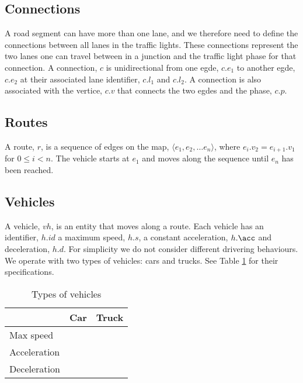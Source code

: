 \subsection{Connections}
A road segment can have more than one lane, and we therefore need to define the connections between all lanes in the traffic lights.
These connections represent the two lanes one can travel between in a junction and the traffic light phase for that connection.
A connection, $c$ is unidirectional from one egde, $c.e_1$ to another egde, $c.e_2$ at their associated lane identifier, $c.l_1$ and $c.l_2$. A connection is also associated with the vertice, $c.v$ that connects the two egdes and the phase, $c.p$.



\begin{comment}
\subsection{Trajectory}
A trajectory, $T$, is a sequence of connected edges on the map, $\langle e_1, e_2, \dots e_n \rangle$, where $e_i.v_2 = e_{i+1}.v_1$ for $0\leq i< n$.
The vehicle starts at $e_1$ and moves along the sequence until $e_n$ has been reached.
\end{comment}

\subsection{Routes}
A route, $r$, is a sequence of edges on the map, $\langle e_1, e_2, \dots e_n \rangle$, where $e_i.v_2 = e_{i+1}.v_1$ for $0\leq i< n$.
The vehicle starts at $e_1$ and moves along the sequence until $e_n$ has been reached.

\subsection{Vehicles}
A vehicle, $vh$, is an entity that moves along a route.
Each vehicle has an identifier, $h.id$ a maximum speed, $h.s$, a constant acceleration, $h.\acc$ and deceleration, $h.d$.
For simplicity we do not consider different drivering behaviours.
We operate with two types of vehicles: cars and trucks. See Table \ref{table.vehicleTypes} for their specifications.
\begin{table}
\centering
\begin{tabular}{|l|l|l|}\hline
				& Car	& Truck \\\hline
Max speed 		& 		& \\\hline
Acceleration 	&		& \\\hline
Deceleration 	&		& \\\hline
\end{tabular}
\caption{Types of vehicles}\label{table.vehicleTypes}
\end{table}

